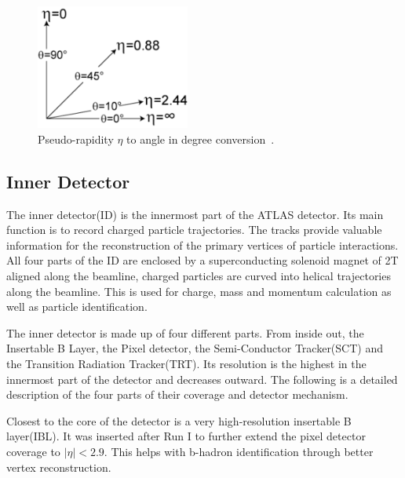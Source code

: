 \begin{figure}[!htb]
    \begin{center}
        \includegraphics[width=0.45\textwidth]{figures/chapter_ATLAS/pseudorapidity}
        \caption{
            Pseudo-rapidity $\eta$ to angle in degree conversion~\cite{enwiki:1052183914}.
        }
        \label{fig:pseudorapidity}
    \end{center}
\end{figure}



\subsection{Inner Detector}
The inner detector(ID) is the innermost part of the ATLAS detector. Its main function is to record charged particle trajectories. The tracks provide valuable information for the reconstruction of the primary vertices of particle interactions. All four parts of the ID are enclosed by a superconducting solenoid magnet of 2T aligned along the beamline, charged particles are curved into helical trajectories along the beamline. This is used for charge, mass and momentum calculation as well as particle
identification. 



The inner detector is made up of four different parts. From inside out, the Insertable B Layer, the Pixel detector, the Semi-Conductor Tracker(SCT) and the Transition Radiation Tracker(TRT). 
Its resolution is the highest in the innermost part of the detector and decreases outward. The following is a detailed description of the four parts of their coverage and detector mechanism. 

Closest to the core of the detector is a very high-resolution insertable B layer(IBL). It was inserted after Run I to further extend the pixel detector coverage to $|\eta|< 2.9$. This helps with b-hadron identification through better vertex reconstruction.

